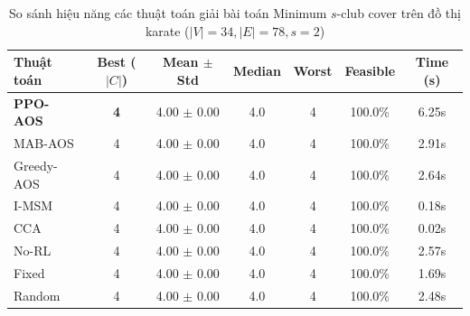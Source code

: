 \begin{table}[htbp]
\centering
\caption{So sánh hiệu năng các thuật toán giải bài toán Minimum $s$-club cover trên đồ thị karate ($|V|=34, |E|=78, s=2$)}
\label{tab:results_karate}
\begin{tabular}{lcccccc}
\hline
\textbf{Thuật toán} & \textbf{Best ($|C|$)} & \textbf{Mean $\pm$ Std} & \textbf{Median} & \textbf{Worst} & \textbf{Feasible} & \textbf{Time (s)} \\
\hline
\textbf{PPO-AOS} & \textbf{4} & 4.00 $\pm$ 0.00 & 4.0 & 4 & 100.0\% & 6.25s \\
MAB-AOS & 4 & 4.00 $\pm$ 0.00 & 4.0 & 4 & 100.0\% & 2.91s \\
Greedy-AOS & 4 & 4.00 $\pm$ 0.00 & 4.0 & 4 & 100.0\% & 2.64s \\
I-MSM & 4 & 4.00 $\pm$ 0.00 & 4.0 & 4 & 100.0\% & 0.18s \\
CCA & 4 & 4.00 $\pm$ 0.00 & 4.0 & 4 & 100.0\% & 0.02s \\
No-RL & 4 & 4.00 $\pm$ 0.00 & 4.0 & 4 & 100.0\% & 2.57s \\
Fixed & 4 & 4.00 $\pm$ 0.00 & 4.0 & 4 & 100.0\% & 1.69s \\
Random & 4 & 4.00 $\pm$ 0.00 & 4.0 & 4 & 100.0\% & 2.48s \\
\hline
\end{tabular}
\end{table}

